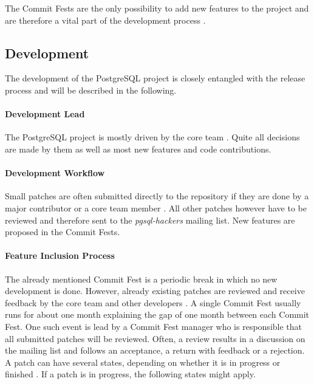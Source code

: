 The Commit Fests are the only possibility to add new features to the project and
are therefore a vital part of the development process
\cite{PostgreSQLDevelopment,PostgreSQLCommitFest}. 

\subsection{Development}

The development of the PostgreSQL project is closely entangled with the release
process and will be described in the following.

\paragraph{Development Lead}

The PostgreSQL project is mostly driven by the core team
\cite{PostgreSQLDevFAQ,PostgreSQLFAQ,PostgreSQLContributors}. Quite all
decisions are made by them as well as most new features and code contributions.

\paragraph{Development Workflow}

Small patches are often submitted directly to the repository if they are done
by a major contributor or a core team member \cite{PostgreSQLDevFAQ}. All other
patches however have to be reviewed and therefore sent to the
\emph{pgsql-hackers} mailing list. New features are proposed in the Commit
Fests.

\paragraph{Feature Inclusion Process}

The already mentioned Commit Fest is a periodic break in which no new
development is done. However, already existing patches are reviewed and receive
feedback by the core team and other developers \cite{PostgreSQLCommitFest}. A
single Commit Fest usually runs for about one month explaining the gap of one
month between each Commit Fest. One such event is lead by a Commit Fest manager
who is responsible that all submitted patches will be reviewed. Often, a review
results in a discussion on the mailing list and follows an acceptance, a return
with feedback or a rejection. A patch can have several states, depending on
whether it is in progress or finished \cite{PostgreSQLCommitFestRunning}. If a
patch is in progress, the following states might apply.

